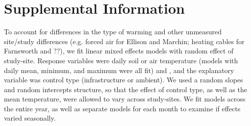 \documentclass{article}
\begin{document}

\section{Supplemental Information}

To account for differences in the type of warming and other unmeasured site/study differences (e.g. forced air for Ellison and Marchin; heating cables for Farnsworth and ??), we fit linear mixed effects models with random effect of study-site. Response variables were daily soil or air temperature (models with daily  mean, minimum, and maximum were all fit) and , and the explanatory variable was control type (infrastructure or ambient). We used a random slopes and random intercepts structure, so that the effect of control type, as well as the mean temperature, were allowed to vary across study-sites. We fit models across the entire year, as well as separate models for each month to examine if effects varied seasonally.



\end{document}
